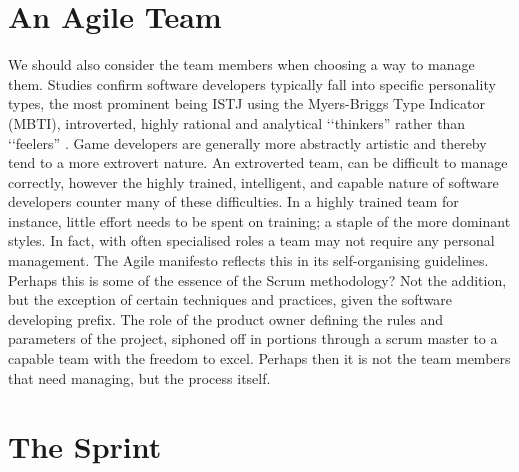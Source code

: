 \documentclass{scrartcl}
\begin{document}
\section*{An Agile Team}

We should also consider the team members when choosing a way to manage them.  Studies confirm software developers typically fall into specific personality types, the most prominent being ISTJ using the Myers-Briggs Type Indicator (MBTI), introverted, highly rational and analytical `‘thinkers'' rather than `‘feelers'' \cite{wiesche2014relationship}.  Game developers are generally more abstractly artistic and thereby tend to a more extrovert nature.  An extroverted team, can be difficult to manage correctly, however the highly trained, intelligent, and capable nature of software developers counter many of these difficulties.  In a highly trained team for instance, little effort needs to be spent on training; a staple of the more dominant styles.  In fact, with often specialised roles a team may not require any personal management.  The Agile manifesto \cite {fowler2001agile} reflects this in its self-organising guidelines.  Perhaps this is some of the essence of the Scrum methodology?  Not the addition, but the exception of certain techniques and practices, given the software developing prefix.  The role of the product owner defining the rules and parameters of the project, siphoned off in portions through a scrum master to a capable team with the freedom to excel.  Perhaps then it is not the team members that need managing, but the process itself.

\section*{The Sprint}
\end{document}

